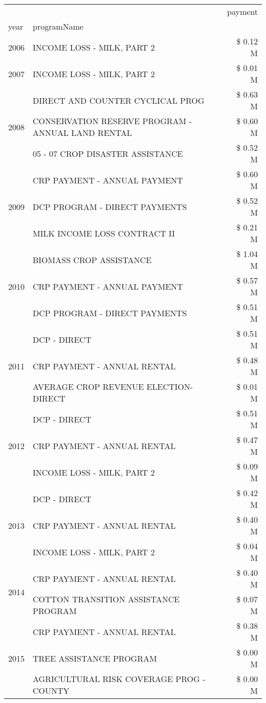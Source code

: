 \begin{tabular}{llr}
\toprule
 &  & payment \\
year & programName &  \\
\midrule
2006 & INCOME LOSS - MILK, PART 2 & \$ 0.12 M \\
\cline{1-3}
2007 & INCOME LOSS - MILK, PART 2 & \$ 0.01 M \\
\cline{1-3}
\multirow[t]{3}{*}{2008} & DIRECT AND COUNTER CYCLICAL PROG & \$ 0.63 M \\
 & CONSERVATION RESERVE PROGRAM - ANNUAL LAND RENTAL & \$ 0.60 M \\
 & 05 - 07 CROP DISASTER ASSISTANCE & \$ 0.52 M \\
\cline{1-3}
\multirow[t]{3}{*}{2009} & CRP PAYMENT - ANNUAL PAYMENT & \$ 0.60 M \\
 & DCP PROGRAM - DIRECT PAYMENTS & \$ 0.52 M \\
 & MILK INCOME LOSS CONTRACT II & \$ 0.21 M \\
\cline{1-3}
\multirow[t]{3}{*}{2010} & BIOMASS CROP ASSISTANCE & \$ 1.04 M \\
 & CRP PAYMENT - ANNUAL PAYMENT & \$ 0.57 M \\
 & DCP PROGRAM - DIRECT PAYMENTS & \$ 0.51 M \\
\cline{1-3}
\multirow[t]{3}{*}{2011} & DCP - DIRECT & \$ 0.51 M \\
 & CRP PAYMENT - ANNUAL RENTAL & \$ 0.48 M \\
 & AVERAGE CROP REVENUE ELECTION-DIRECT & \$ 0.01 M \\
\cline{1-3}
\multirow[t]{3}{*}{2012} & DCP - DIRECT & \$ 0.51 M \\
 & CRP PAYMENT - ANNUAL RENTAL & \$ 0.47 M \\
 & INCOME LOSS - MILK, PART 2 & \$ 0.09 M \\
\cline{1-3}
\multirow[t]{3}{*}{2013} & DCP - DIRECT & \$ 0.42 M \\
 & CRP PAYMENT - ANNUAL RENTAL & \$ 0.40 M \\
 & INCOME LOSS - MILK, PART 2 & \$ 0.04 M \\
\cline{1-3}
\multirow[t]{2}{*}{2014} & CRP PAYMENT - ANNUAL RENTAL & \$ 0.40 M \\
 & COTTON TRANSITION ASSISTANCE PROGRAM & \$ 0.07 M \\
\cline{1-3}
\multirow[t]{3}{*}{2015} & CRP PAYMENT - ANNUAL RENTAL & \$ 0.38 M \\
 & TREE ASSISTANCE PROGRAM & \$ 0.00 M \\
 & AGRICULTURAL RISK COVERAGE PROG - COUNTY & \$ 0.00 M \\

\end{tabular}
